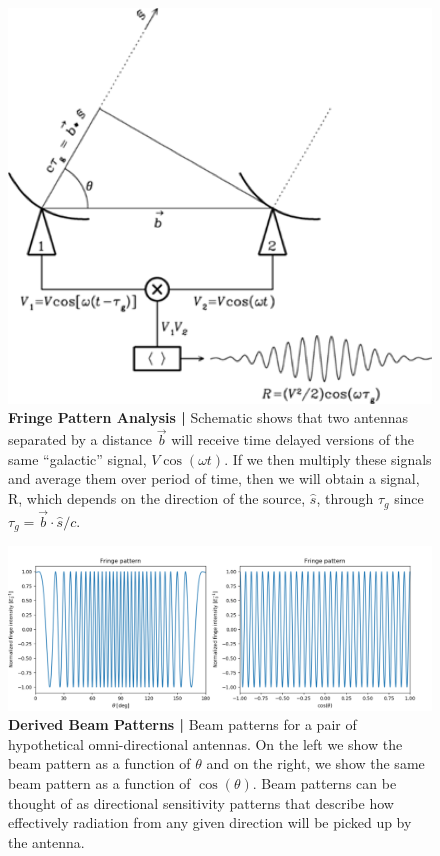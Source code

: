 \documentclass[12pt,a4paper]{article}
\begin{document}
\begin{figure}
\centering
\includegraphics[width=.8\textwidth]{_images/AntGeometry.png}
\caption{\textbf{Fringe Pattern Analysis |} Schematic shows that two antennas separated by a distance $\vec{b}$ will receive time delayed versions of the same ``galactic'' signal, $V\cos(\omega t)$. If we then multiply these signals and average them over period of time, then we will obtain a signal, R, which depends on the direction of the source, $\hat{s}$, through $\tau_g$ since $\tau_g = \vec{b} \cdot \hat{s} / c$.
}
\end{figure}


\begin{figure}
\centering
\includegraphics[width=\textwidth]{_images/FringePattern.png}
\caption{\textbf{Derived Beam Patterns |} Beam patterns for a pair of hypothetical omni-directional antennas. On the left we show the beam pattern as a function of $\theta$ and on the right, we show the same beam pattern as a function of $\cos(\theta)$. Beam patterns can be thought of as directional sensitivity patterns that describe how effectively radiation from any given direction will be picked up by the antenna. 
}
\end{figure}
\end{document}
